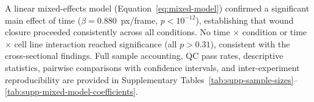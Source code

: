 A linear mixed-effects model (Equation~\eqref{eq:mixed-model}) confirmed a significant
main effect of time ($\beta = 0.880$~px/frame, $p < 10^{-12}$), establishing that wound
closure proceeded consistently across all conditions.
No time $\times$ condition or time $\times$ cell line interaction reached significance
(all $p > 0.31$), consistent with the cross-sectional findings.
Full sample accounting, QC pass rates, descriptive statistics, pairwise comparisons with
confidence intervals, and inter-experiment reproducibility are provided in
Supplementary Tables~\ref{tab:supp-sample-sizes}--\ref{tab:supp-mixed-model-coefficients}.
